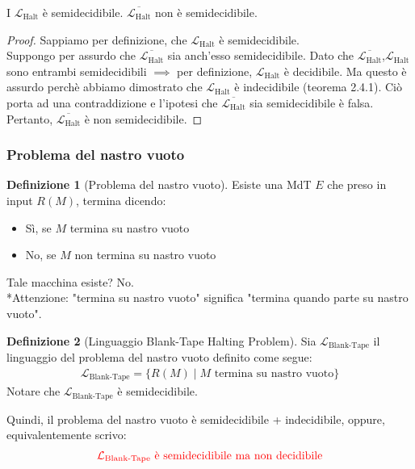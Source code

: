 \documentclass{article}  %
\theoremstyle{definition}
\newtheorem{definition}{Definizione}[section]
\begin{document}
\begin{theorem}{}
  I $\mathcal{L}_{\text{Halt}}$ è semidecidibile. 
  $\overline{\mathcal{L}_{\text{Halt}}}$ non è semidecidibile.
  \footnotesize %
  \begin{proof}
    Sappiamo per definizione, che $\mathcal{L}_{\text{Halt}}$ è semidecidibile. \\
    Suppongo per assurdo che $\overline{\mathcal{L}_{\text{Halt}}}$ sia anch'esso semidecidibile. Dato che
    $\overline{\mathcal{L}_{\text{Halt}}}$,$\mathcal{L}_{\text{Halt}}$ sono entrambi semidecidibili $\implies$ per
    definizione, $\mathcal{L}_{\text{Halt}}$ è decidibile. Ma questo è assurdo perchè abbiamo dimostrato che 
    $\mathcal{L}_{\text{Halt}}$ è indecidibile (teorema 2.4.1). Ciò porta ad una contraddizione e l'ipotesi che $\overline{\mathcal{L}_{\text{Halt}}}$
    sia semidecidibile è falsa. \\ Pertanto, $\overline{\mathcal{L}_{\text{Halt}}}$ è non semidecidibile. 
  \end{proof}
\end{theorem}

\subsubsection{Problema del nastro vuoto}
\begin{definition}[Problema del nastro vuoto]
  Esiste una MdT $E$ che preso in input $R(M)$, termina dicendo:
  \begin{itemize}
    \item Sì, se $M$ termina su nastro vuoto
    \item No, se $M$ non termina su nastro vuoto
  \end{itemize}
  Tale macchina esiste? No. \\
  \footnotesize %
  *Attenzione: "termina su nastro vuoto" significa "termina quando parte su nastro vuoto".
\end{definition}
\begin{definition}[Linguaggio Blank-Tape Halting Problem]
  Sia $\mathcal{L}_{\text{Blank-Tape}}$ il linguaggio del problema del nastro vuoto definito come segue:
  \begin{align*}
    \mathcal{L}_{\text{Blank-Tape}} = \{R(M) \mid M \text{ termina su nastro vuoto}\}
  \end{align*}
  Notare che $\mathcal{L}_{\text{Blank-Tape}}$ è semidecidibile.
\end{definition}
Quindi, il problema del nastro vuoto è semidecidibile + indecidibile, oppure, equivalentemente scrivo:
\begin{align*}
  \textcolor{red}{\mathcal{L}_{\text{Blank-Tape}} \text{ è semidecidibile ma non decidibile}}
\end{align*}
\end{document}
